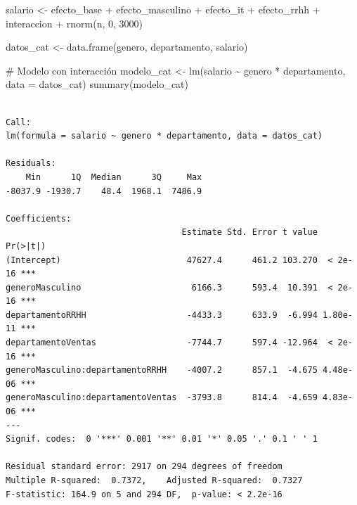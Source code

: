 \documentclass[
  letterpaper,
  DIV=11,
  numbers=noendperiod]{scrreprt}
\newenvironment{Shaded}{\begin{snugshade}}{\end{snugshade}}
\newcommand{\AttributeTok}[1]{\textcolor[rgb]{0.40,0.45,0.13}{#1}}
\newcommand{\CommentTok}[1]{\textcolor[rgb]{0.37,0.37,0.37}{#1}}
\newcommand{\DecValTok}[1]{\textcolor[rgb]{0.68,0.00,0.00}{#1}}
\newcommand{\FunctionTok}[1]{\textcolor[rgb]{0.28,0.35,0.67}{#1}}
\newcommand{\NormalTok}[1]{\textcolor[rgb]{0.00,0.23,0.31}{#1}}
\newcommand{\OtherTok}[1]{\textcolor[rgb]{0.00,0.23,0.31}{#1}}
\newcommand{\SpecialCharTok}[1]{\textcolor[rgb]{0.37,0.37,0.37}{#1}}
\newcommand{\StringTok}[1]{\textcolor[rgb]{0.13,0.47,0.30}{#1}}
\begin{document}
\begin{tcolorbox}
\begin{Shaded}
\begin{Highlighting}[]
\NormalTok{salario }\OtherTok{\textless{}{-}}\NormalTok{ efecto\_base }\SpecialCharTok{+}\NormalTok{ efecto\_masculino }\SpecialCharTok{+}\NormalTok{ efecto\_it }\SpecialCharTok{+}\NormalTok{ efecto\_rrhh }\SpecialCharTok{+} 
\NormalTok{           interaccion }\SpecialCharTok{+} \FunctionTok{rnorm}\NormalTok{(n, }\DecValTok{0}\NormalTok{, }\DecValTok{3000}\NormalTok{)}

\NormalTok{datos\_cat }\OtherTok{\textless{}{-}} \FunctionTok{data.frame}\NormalTok{(genero, departamento, salario)}

\CommentTok{\# Modelo con interacción}
\NormalTok{modelo\_cat }\OtherTok{\textless{}{-}} \FunctionTok{lm}\NormalTok{(salario }\SpecialCharTok{\textasciitilde{}}\NormalTok{ genero }\SpecialCharTok{*}\NormalTok{ departamento, }\AttributeTok{data =}\NormalTok{ datos\_cat)}
\FunctionTok{summary}\NormalTok{(modelo\_cat)}
\end{Highlighting}
\end{Shaded}

\begin{verbatim}

Call:
lm(formula = salario ~ genero * departamento, data = datos_cat)

Residuals:
    Min      1Q  Median      3Q     Max 
-8037.9 -1930.7    48.4  1968.1  7486.9 

Coefficients:
                                   Estimate Std. Error t value Pr(>|t|)    
(Intercept)                         47627.4      461.2 103.270  < 2e-16 ***
generoMasculino                      6166.3      593.4  10.391  < 2e-16 ***
departamentoRRHH                    -4433.3      633.9  -6.994 1.80e-11 ***
departamentoVentas                  -7744.7      597.4 -12.964  < 2e-16 ***
generoMasculino:departamentoRRHH    -4007.2      857.1  -4.675 4.48e-06 ***
generoMasculino:departamentoVentas  -3793.8      814.4  -4.659 4.83e-06 ***
---
Signif. codes:  0 '***' 0.001 '**' 0.01 '*' 0.05 '.' 0.1 ' ' 1

Residual standard error: 2917 on 294 degrees of freedom
Multiple R-squared:  0.7372,    Adjusted R-squared:  0.7327 
F-statistic: 164.9 on 5 and 294 DF,  p-value: < 2.2e-16
\end{verbatim}

\begin{Shaded}
\end{Shaded}


\end{tcolorbox}
\end{document}
